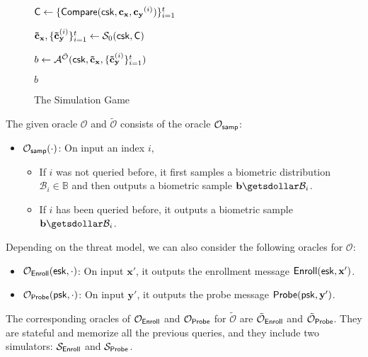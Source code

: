 \begin{figure}[h]
{\begin{minipage}{0.49\textwidth}
\begin{algorithm}[H]
\begin{algorithmic}[1]
		\State ${\sf C} \gets \{ {\sf Compare}({\sf csk}, \mathbf{c_x}, \mathbf{c_y}^{(i)}) \}_{i=1}^t$

		\State $\mathbf{\tilde c_x}, \{\mathbf{\tilde c_y}^{(i)}\}_{i=1}^t \gets \mathcal{S}_0( {\sf csk}, {\sf C} )$

		\State $b \gets \mathcal{A}^\mathcal{\tilde O} ({\sf csk}, \mathbf{\tilde c_x}, \{ \mathbf{\tilde c_y}^{(i)} \}_{i=1}^t )$

		\State \Return $b$
			
	\end{algorithmic}
	\end{algorithm}
	\end{minipage}	
}
\caption{The Simulation Game}
\label{fig:sim_game}
\end{figure}

The given oracle $\mathcal{O}$ and $\mathcal{\tilde O}$ consists of the oracle $\mathcal{O}_{\sf samp}$:

\begin{itemize}
	\item $\mathcal{O}_{\sf samp}(\cdot)$: On input an index $i$,
	\begin{itemize}
		\item If $i$ was not queried before, it first samples a biometric distribution $\mathcal{B}_i \in \mathbb{B}$ and then outputs a biometric sample $\mathbf{b} \getsdollar \mathcal{B}_i$.
		\item If $i$ has been queried before, it outputs a biometric sample $\mathbf{b} \getsdollar \mathcal{B}_i$.
	\end{itemize}

\end{itemize}

Depending on the threat model, we can also consider the following oracles for $\mathcal{O}$:

\begin{itemize}
	\item $\mathcal{O}_{\sf Enroll}({\sf esk}, \cdot)$: On input $\mathbf{x'}$, it outputs the enrollment message ${\sf Enroll}({\sf esk}, \mathbf{x'})$.

	\item $\mathcal{O}_{\sf Probe}({\sf psk}, \cdot)$: On input $\mathbf{y'}$, it outputs the probe message ${\sf Probe}({\sf psk}, \mathbf{y'})$.
\end{itemize}

The corresponding oracles of $\mathcal{O}_{\sf Enroll}$ and $\mathcal{O}_{\sf Probe}$ for $\mathcal{\tilde O}$ are $\tilde{\mathcal{O}}_{\sf Enroll}$ and $\tilde{\mathcal{O}}_{\sf Probe}$. They are stateful and memorize all the previous queries, and they include two simulators: $\mathcal{S}_{\sf Enroll}$ and $\mathcal{S}_{\sf Probe}$.

